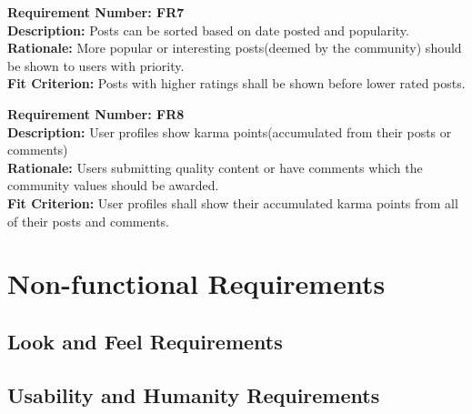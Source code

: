 \documentclass[12pt,fleqn]{article}
\begin{document}
\begin{tcolorbox}
\textbf{Requirement Number: FR7} \\
\textbf{Description:} Posts can be sorted based on date posted and popularity.\\
\textbf{Rationale:} More popular or interesting posts(deemed by the community) should be shown to users with priority. \\
\textbf{Fit Criterion:} Posts with higher ratings shall be shown before lower rated posts.
\end{tcolorbox}

\begin{tcolorbox}
\textbf{Requirement Number: FR8} \\
\textbf{Description:} User profiles show karma points(accumulated from their posts or comments) \\
\textbf{Rationale:} Users submitting quality content or have comments which the community values should be awarded.\\
\textbf{Fit Criterion:} User profiles shall show their accumulated karma points from all of their posts and comments.
\end{tcolorbox}

\pagebreak
\section {Non-functional Requirements}

\subsection {Look and Feel Requirements}

\subsection {Usability and Humanity Requirements}
\end{document}
